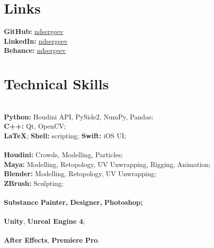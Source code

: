 \documentclass[]{cv-class}
\begin{document}
\begin{minipage}[t]{0.3\textwidth}
\section{Links}
\textcolor{subsec_col}{\textbf{GitHub:}} \href{https://github.com/ndsergeev}{ndsergeev} \\
\textcolor{subsec_col}{\textbf{LinkedIn:}} \href{https://www.linkedin.com/in/ndsergeev/}{ndsergeev} \\
\textcolor{subsec_col}{\textbf{Behance:}} \href{https://www.behance.net/ndsergeev}{ndsergeev}

\smallSeparator{0.4pt}
\section{Technical Skills}
{} \\
\textbf{Python:} Houdini API, PySide2, NumPy, Pandas; \\
\textbf{C++:} Qt, OpenCV; \\ 
\textbf{\LaTeX};
\textbf{Shell:} scripting;
\textbf{Swift:} iOS UI; \\

{} \\
\textbf{Houdini:} Crowds, Modelling, Particles; \\
\textbf{Maya:} Modelling, Retopology, UV Unwrapping, Rigging, Animation; \\
\textbf{Blender:} Modelling, Retopology, UV Unwrapping; \\
\textbf{ZBrush:} Sculpting; \\

{} \\
\textbf{Substance Painter,}
\textbf{Designer,}
\textbf{Photoshop;} \\

{} \\
\textbf{Unity},
\textbf{Unreal Engine 4}; \\

{} \\
\textbf{After Effects},
\textbf{Premiere Pro}.

\smallSeparator{0.4pt}

\end{minipage}
\end{document}
